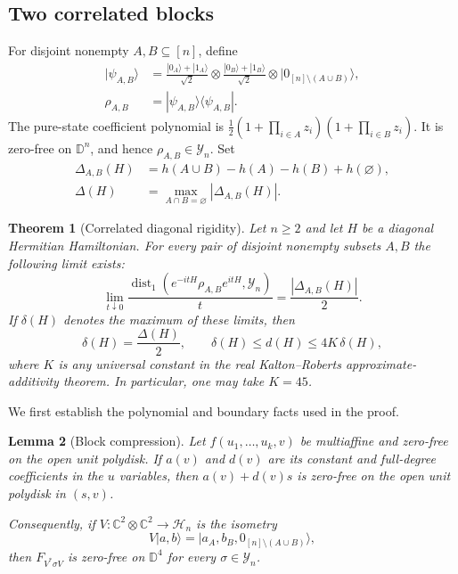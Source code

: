 \documentclass[reqno]{amsart}
\newtheorem{theorem}{Theorem}[section]
\newtheorem{lemma}[theorem]{Lemma}
\theoremstyle{definition}
\theoremstyle{remark}
\newcommand{\C}{\mathbb C}
\newcommand{\D}{\mathbb D}
\begin{document}
\subsection{Two correlated blocks}

For disjoint nonempty $A,B\subseteq[n]$, define
\begin{equation}
\begin{aligned}
 |\psi_{A,B}\rangle
 &=\frac{|0_A\rangle+|1_A\rangle}{\sqrt2}
  \otimes\frac{|0_B\rangle+|1_B\rangle}{\sqrt2}
  \otimes|0_{[n]\setminus(A\cup B)}\rangle,\\
 \rho_{A,B}&=|\psi_{A,B}\rangle\langle\psi_{A,B}|.
\end{aligned}
 \label{rob:ghz-probe}
\end{equation}
The pure-state coefficient polynomial is
$\frac12(1+\prod_{i\in A}z_i)(1+\prod_{i\in B}z_i)$.
It is zero-free on $\D^n$, and hence $\rho_{A,B}\in\mathcal Y_n$.
Set
\begin{align*}
 \Delta_{A,B}(H)&=h(A\cup B)-h(A)-h(B)+h(\varnothing),\\
 \Delta(H)&=\max_{A\cap B=\varnothing}|\Delta_{A,B}(H)|.
\end{align*}

\begin{theorem}[Correlated diagonal rigidity]
\label{rob:diagonal}
Let $n\geq2$ and let $H$ be a diagonal Hermitian Hamiltonian.  For every
pair of disjoint nonempty subsets $A,B$ the following limit exists:
\begin{equation}
 \lim_{t\downarrow0}
 \frac{\operatorname{dist}_1
       (e^{-itH}\rho_{A,B}e^{itH},\mathcal Y_n)}{t}
 =\frac{|\Delta_{A,B}(H)|}{2}.
 \label{rob:exact-defect}
\end{equation}
If $\delta(H)$ denotes the maximum of these limits, then
\begin{equation}
 \delta(H)=\frac{\Delta(H)}2,
 \qquad
 \delta(H)\leq d(H)\leq4K\,\delta(H),
 \label{rob:diagonal-bounds}
\end{equation}
where $K$ is any universal constant in the real Kalton--Roberts
approximate-additivity theorem.  In particular, one may take $K=45$.
\end{theorem}

We first establish the polynomial and boundary facts used in the proof.

\begin{lemma}[Block compression]
\label{rob:compression}
Let $f(u_1,\ldots,u_k,v)$ be multiaffine and zero-free on the open unit
polydisk.  If $a(v)$ and $d(v)$ are its constant and full-degree
coefficients in the $u$ variables, then $a(v)+d(v)s$ is zero-free on
the open unit polydisk in $(s,v)$.

Consequently, if
$V:\C^2\otimes\C^2\longrightarrow\mathcal H_n$ is the isometry
\[
 V|a,b\rangle=|a_A,b_B,0_{[n]\setminus(A\cup B)}\rangle,
\]
then $F_{V^*\sigma V}$ is zero-free on $\D^4$ for every
$\sigma\in\mathcal Y_n$.
\end{lemma}
\end{document}
